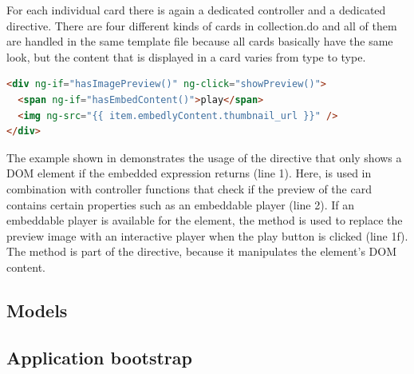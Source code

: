 For each individual card there is again a dedicated controller and a dedicated directive. There are four different kinds of cards in collection.do and all of them are handled in the same template file because all cards basically have the same look, but the content that is displayed in a card varies from type to type. 

\begin{lstlisting}[language=HTML, caption=CardListController template, label=lst:card-template]
<div ng-if="hasImagePreview()" ng-click="showPreview()">
  <span ng-if="hasEmbedContent()">play</span>
  <img ng-src="{{ item.embedlyContent.thumbnail_url }}" />
</div>
\end{lstlisting}

The example shown in  demonstrates the usage of the  directive that only shows a DOM element if the embedded expression returns  (line 1). Here,  is used in combination with controller functions that check if the preview of the card contains certain properties such as an embeddable player (line 2). If an embeddable player is available for the element, the  method is used to replace the preview image with an interactive player when the play button is clicked (line 1f). The  method is part of the directive, because it manipulates the element's DOM content.

\subsection{Models}

\subsection{Application bootstrap}